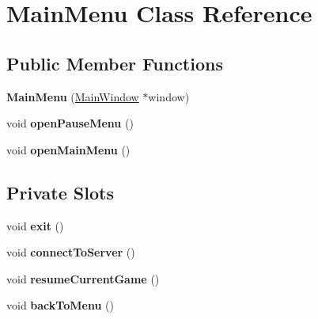 \hypertarget{classMainMenu}{
\section{MainMenu Class Reference}
\label{classMainMenu}
}
\subsection*{Public Member Functions}
\begin{DoxyCompactItemize}
\item 
\hypertarget{classMainMenu_a9daea466639af8c7b00b82eb8629f030}{
{\bfseries MainMenu} (\hyperlink{classMainWindow}{MainWindow} $\ast$window)}
\label{classMainMenu_a9daea466639af8c7b00b82eb8629f030}

\item 
\hypertarget{classMainMenu_a1094bb119c85c4748c7400ad839d93d4}{
void {\bfseries openPauseMenu} ()}
\label{classMainMenu_a1094bb119c85c4748c7400ad839d93d4}

\item 
\hypertarget{classMainMenu_a89d05414f4371af727f40c3c48c4a65d}{
void {\bfseries openMainMenu} ()}
\label{classMainMenu_a89d05414f4371af727f40c3c48c4a65d}

\end{DoxyCompactItemize}
\subsection*{Private Slots}
\begin{DoxyCompactItemize}
\item 
\hypertarget{classMainMenu_a2b04f286323c038ed76d1bff70660554}{
void {\bfseries exit} ()}
\label{classMainMenu_a2b04f286323c038ed76d1bff70660554}

\item 
\hypertarget{classMainMenu_a12fb404980c015f4816b1d4f2d53c0f2}{
void {\bfseries connectToServer} ()}
\label{classMainMenu_a12fb404980c015f4816b1d4f2d53c0f2}

\item 
\hypertarget{classMainMenu_a54321757e9244ae55a66d0c40594bcf8}{
void {\bfseries resumeCurrentGame} ()}
\label{classMainMenu_a54321757e9244ae55a66d0c40594bcf8}

\item 
\hypertarget{classMainMenu_a29b72154d8b842d426798990f67ebaa2}{
void {\bfseries backToMenu} ()}
\label{classMainMenu_a29b72154d8b842d426798990f67ebaa2}

\end{DoxyCompactItemize}
